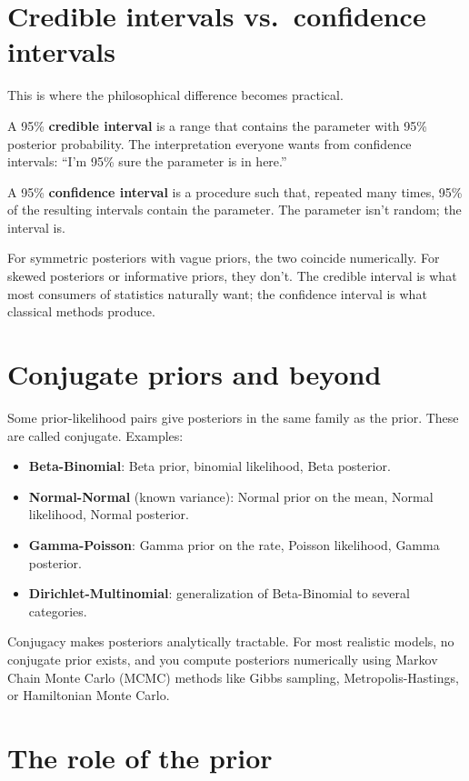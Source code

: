 \section{Credible intervals vs.\ confidence intervals}

This is where the philosophical difference becomes practical.

A 95\% \textbf{credible interval} is a range that contains the parameter with 95\% posterior probability. The interpretation everyone wants from confidence intervals: ``I'm 95\% sure the parameter is in here.''

A 95\% \textbf{confidence interval} is a procedure such that, repeated many times, 95\% of the resulting intervals contain the parameter. The parameter isn't random; the interval is.

For symmetric posteriors with vague priors, the two coincide numerically. For skewed posteriors or informative priors, they don't. The credible interval is what most consumers of statistics naturally want; the confidence interval is what classical methods produce.

\section{Conjugate priors and beyond}

Some prior-likelihood pairs give posteriors in the same family as the prior. These are called conjugate. Examples:

\begin{itemize}[noitemsep]
  \item \textbf{Beta-Binomial}: Beta prior, binomial likelihood, Beta posterior.
  \item \textbf{Normal-Normal} (known variance): Normal prior on the mean, Normal likelihood, Normal posterior.
  \item \textbf{Gamma-Poisson}: Gamma prior on the rate, Poisson likelihood, Gamma posterior.
  \item \textbf{Dirichlet-Multinomial}: generalization of Beta-Binomial to several categories.
\end{itemize}

Conjugacy makes posteriors analytically tractable. For most realistic models, no conjugate prior exists, and you compute posteriors numerically using Markov Chain Monte Carlo (MCMC) methods like Gibbs sampling, Metropolis-Hastings, or Hamiltonian Monte Carlo.

\section{The role of the prior}

